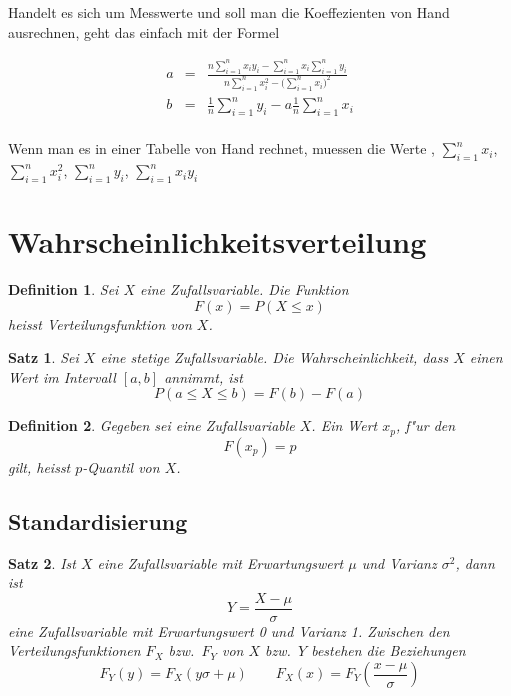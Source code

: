 \documentclass[ngerman, a4paper, 10pt, twocolumn, DIV20, headings=small]{scrartcl}
\newtheorem{definition}{Definition}
\newtheorem{satz}{Satz}
\begin{document}
Handelt es sich um Messwerte und soll man die Koeffezienten von Hand ausrechnen, geht das einfach mit der Formel

\begin{eqnarray*}
a&=&\frac{\displaystyle n\sum_{i=1}^nx_iy_i-\sum_{i=1}^nx_i\sum_{i=1}^ny_i}{\displaystyle n\sum_{i=1}^nx_i^2-\biggl(\sum_{i=1}^nx_i\biggr)^2}\\
b&=&\frac1n\sum_{i=1}^ny_i-a\frac1n\sum_{i=1}^nx_i\\
\end{eqnarray*}

Wenn man es in einer Tabelle von Hand rechnet, muessen die Werte , $\sum_{i=1}^nx_i$, $\sum_{i=1}^nx_i^2$, $\sum_{i=1}^ny_i$, $\sum_{i=1}^nx_iy_i$

\section{Wahrscheinlichkeitsverteilung}

\begin{definition}
Sei $X$ eine Zufallsvariable. Die Funktion
\[
F(x) = P(X\le x)
\]
heisst Verteilungsfunktion von $X$. 
\end{definition}

\begin{satz}
  Sei $X$ eine stetige Zufallsvariable. Die Wahrscheinlichkeit, dass $X$ einen Wert im Intervall $[a,b]$ annimmt, ist
\[
P(a \le X \le b) = F(b) - F(a)
\]
\end{satz}

\begin{definition}
  Gegeben sei eine Zufallsvariable 
$X$. Ein Wert $x_p$, f"ur den
\[
F(x_p) = p
\]
gilt, heisst $p$-Quantil von $X$.
\end{definition}

\subsection{Standardisierung}
\label{sec:standardisierung}


\begin{satz}
\label{satz-standardisierung}
Ist $X$ eine Zufallsvariable mit Erwartungswert $\mu$ und
Varianz $\sigma^2$, dann ist
\[
Y=\frac{X-\mu}\sigma
\]
eine Zufallsvariable mit Erwartungswert 0 und Varianz 1.
Zwischen den Verteilungsfunktionen $F_X$ bzw.~$F_Y$ von $X$ bzw.~$Y$ 
bestehen die Beziehungen
\[
F_Y(y)=F_X(y\sigma+\mu)\qquad F_X(x)=F_Y\left(\frac{x-\mu}\sigma\right)
\]

\end{satz}
\end{document}
